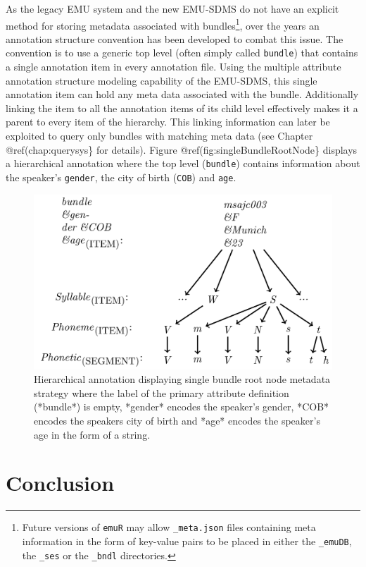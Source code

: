 \documentclass[]{book}
\let\rmarkdownfootnote\footnote%
\def\footnote{\protect\rmarkdownfootnote}
\theoremstyle{definition}
\theoremstyle{definition}
\theoremstyle{definition}
\theoremstyle{remark}
\begin{document}
As the legacy EMU system and the new EMU-SDMS do not have an explicit
method for storing metadata associated with bundles\footnote{Future
  versions of \texttt{emuR} may allow \texttt{\_meta.json} files
  containing meta information in the form of key-value pairs to be
  placed in either the \texttt{\_emuDB}, the \texttt{\_ses} or the
  \texttt{\_bndl} directories.}, over the years an annotation structure
convention has been developed to combat this issue. The convention is to
use a generic top level (often simply called \texttt{bundle}) that
contains a single annotation item in every annotation file. Using the
multiple attribute annotation structure modeling capability of the
EMU-SDMS, this single annotation item can hold any meta data associated
with the bundle. Additionally linking the item to all the annotation
items of its child level effectively makes it a parent to every item of
the hierarchy. This linking information can later be exploited to query
only bundles with matching meta data (see Chapter @ref(chap:querysys\}
for details). Figure @ref(fig:singleBundleRootNode\} displays a
hierarchical annotation where the top level (\texttt{bundle}) contains
information about the speaker's \texttt{gender}, the city of birth
(\texttt{COB}) and \texttt{age}.

\begin{figure}

{\centering \includegraphics[width=0.65\linewidth]{pics/singleBundleRootNode} 

}

\caption{Hierarchical annotation displaying single bundle root node metadata strategy where the label of the primary attribute definition (*bundle*) is empty, *gender* encodes the speaker's gender, *COB* encodes the speakers city of birth and *age* encodes the speaker's age in the form of a string.}\label{fig:singleBundleRootNode}
\end{figure}

\hypertarget{conclusion-1}{%
\section{Conclusion}\label{conclusion-1}}
\end{document}
